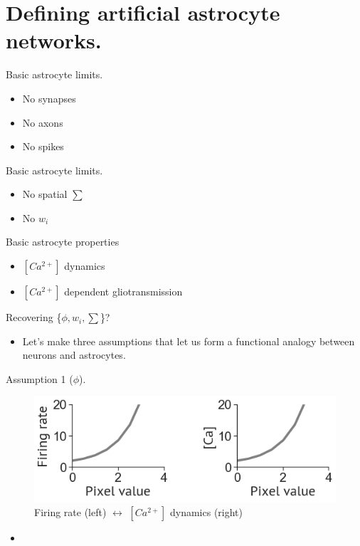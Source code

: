\documentclass[10pt]{beamer}
\begin{document}
\section[AANs]{Defining artificial astrocyte networks.}

\begin{frame}[fragile]{Basic astrocyte limits.}
\begin{itemize}
    \item No synapses
    \item No axons 
    \item No spikes
\end{itemize}
\end{frame}

\begin{frame}[fragile]{Basic astrocyte limits.}
\begin{itemize}
    \item No spatial $\sum$
    \item No $w_i$
\end{itemize}
\end{frame}

\begin{frame}[fragile]{Basic astrocyte properties}
\begin{itemize}
    \item $[Ca^{2+}]$ dynamics
    \item $[Ca^{2+}]$ dependent gliotransmission
\end{itemize}
\end{frame}

\begin{frame}[fragile]{Recovering \{$\phi, w_i, \sum $\}?}
\begin{itemize}
    \item Let's make three assumptions that let us form a functional analogy between neurons and astrocytes.
\end{itemize}
\end{frame}

\begin{frame}[fragile]{Assumption 1 ($\phi$).}
\begin{figure}
    \centering
    \includegraphics[scale=0.4]{images/phi_ca.png}
    \caption{Firing rate (left) $\leftrightarrow$ $[Ca^{2+}]$ dynamics (right)}
\end{figure}
\begin{itemize}
    \item 
\end{itemize}
\end{frame}
\end{document}
